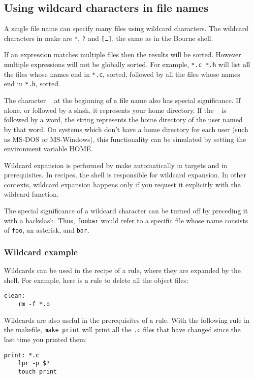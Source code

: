 \subsection{Using wildcard characters in file names}
A single file name can specify many files using wildcard characters. The wildcard characters in make are \texttt{*}, \texttt{?} and \texttt{[…]}, the same as in the Bourne shell.

If an expression matches multiple files then the results will be sorted.
However multiple expressions will not be globally sorted. For example, \texttt{*.c *.h} will list all the files whose names end in \texttt{*.c}, sorted, followed by all the files whose names end in \texttt{*.h}, sorted.

The character \texttt{~} at the beginning of a file name also has special significance. If alone, or followed by a slash, it represents your home directory. If the \texttt{~} is followed by a word, the string represents the home directory of the user named by that word.
On systems which don’t have a home directory for each user (such as MS-DOS or MS-Windows), this functionality can be simulated by setting the environment variable HOME.

Wildcard expansion is performed by make automatically in targets and in prerequisites. In recipes, the shell is responsible for wildcard expansion. In other contexts, wildcard expansion happens only if you request it explicitly with the wildcard function.

The special significance of a wildcard character can be turned off by preceding it with a backslash. Thus, \texttt{foo\*bar} would refer to a specific file whose name consists of \texttt{foo}, an asterisk, and \texttt{bar}.

\subsubsection{Wildcard example}

Wildcards can be used in the recipe of a rule, where they are expanded by the shell. For example, here is a rule to delete all the object files:
\begin{verbatim}
clean:
    rm -f *.o
\end{verbatim}

Wildcards are also useful in the prerequisites of a rule. With the following rule in the makefile, \texttt{make print} will print all the \texttt{.c} files that have changed since the last time you printed them:
\begin{verbatim}
print: *.c
    lpr -p $?
    touch print
\end{verbatim}

